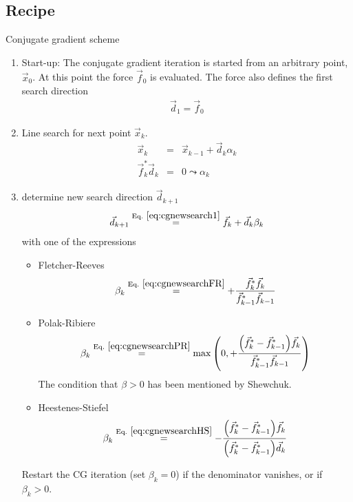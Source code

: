 \documentclass[11pt,a4paper]{report}
\begin{document}
\subsection{Recipe}
\begin{myshadowminipage}{Conjugate gradient scheme}
\begin{enumerate}
\item Start-up: The conjugate gradient iteration is started from an
  arbitrary point, $\vec{x}_0$. At this point the force $\vec{f}_0$ is
  evaluated. The force also defines the first search direction
\begin{eqnarray}
\vec{d}_1=\vec{f}_0
\end{eqnarray}
%
\item Line search for next point $\vec{x}_k$.
\begin{eqnarray}
\vec{x}_k&=&\vec{x}_{k-1}+\vec{d}_k\alpha_k
\label{eq:cgfinalxkwithalphaka}
\\
\vec{f}_k^*\vec{d}_k&=&0\leadsto\alpha_k
\label{eq:cgfinalxkwithalphakb}
\end{eqnarray}
%
\item determine new search direction $\vec{d}_{k+1}$
\begin{eqnarray}
\vec{d}_{k+1}\eqrel{eq:cgnewsearch1}{=}\vec{f}_k+\vec{d}_k\beta_k
\end{eqnarray}
with one of the expressions
\begin{itemize}
\item Fletcher-Reeves
\begin{eqnarray}
\beta_k\eqrel{eq:cgnewsearchFR}{=}
+\frac{\vec{f}_k^*\vec{f}_k}
{\vec{f}_{k-1}^*\vec{f}_{k-1}}
\label{eq:cgfinalnewsearchFR}
\end{eqnarray}
\item Polak-Ribiere
\begin{eqnarray}
\beta_k\eqrel{eq:cgnewsearchPR}{=}
\max\left(0,
+\frac{\Bigl(\vec{f}_k^*-\vec{f}_{k-1}^*\Bigr)\vec{f}_k}
{\vec{f}_{k-1}^*\vec{f}_{k-1}}\right)
\label{eq:cgfinalnewsearchPR}
\end{eqnarray}
The condition that $\beta>0$ has been mentioned by
Shewchuk\cite{shewchuk94_url}.


\item Heestenes-Stiefel
\begin{eqnarray}
\beta_k\eqrel{eq:cgnewsearchHS}{=}
-\frac{\Bigl(\vec{f}_k^*-\vec{f}_{k-1}^*\Bigr)\vec{f}_k}
{\Bigl(\vec{f}_k^*-\vec{f}_{k-1}^*\Bigr)\vec{d}_k}
\label{eq:cgfinalnewsearchHS}
\end{eqnarray}
\end{itemize}
Restart the CG iteration (set $\beta_k=0$) if the denominator
vanishes, or if $\beta_k>0$.
\end{enumerate}
\end{myshadowminipage}
\end{document}
